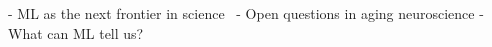 - ML as the next frontier in science \
- Open questions in aging neuroscience 
- What can ML tell us? 

